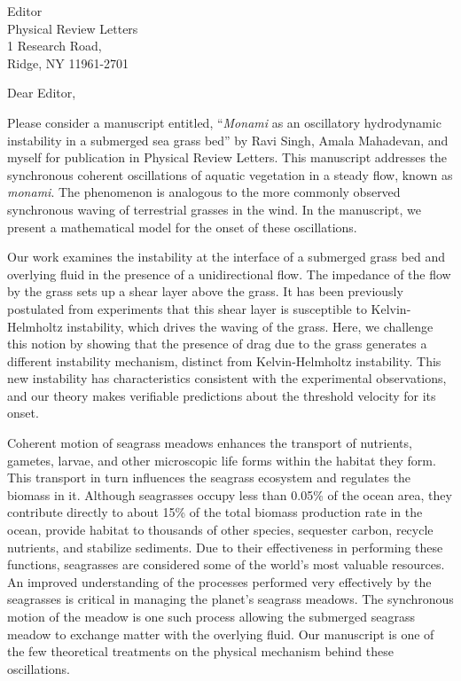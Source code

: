 \documentclass[10pt]{letter}
\date{\today}
\begin{document}
\begin{letter}{
Editor \\
Physical Review Letters \\
1 Research Road, \\
Ridge, NY 11961-2701 
}
\opening{Dear Editor,}

Please consider a manuscript entitled, ``{\it Monami} as an oscillatory hydrodynamic instability in a submerged sea grass bed'' by Ravi Singh, Amala Mahadevan, and myself for publication in  Physical Review Letters. This manuscript addresses the synchronous coherent oscillations of aquatic vegetation in a steady flow, known as {\it monami}. The phenomenon is analogous to the more commonly observed synchronous waving of terrestrial grasses in the wind. In the manuscript, we present a mathematical model for the onset of these oscillations.

Our work examines the instability at the interface of a submerged grass bed and overlying fluid in the presence of a unidirectional flow.  The impedance of the flow by the grass sets up a shear layer above the grass.   It has been previously postulated from experiments that this shear layer is susceptible to  Kelvin-Helmholtz instability, which drives the waving of the grass.  Here, we challenge this notion by showing that the presence of drag due to the grass generates a different instability mechanism, distinct from Kelvin-Helmholtz instability. This new instability has characteristics consistent with the experimental observations, and our theory makes verifiable predictions about the threshold velocity for its onset.

Coherent motion of seagrass meadows enhances the transport of nutrients, gametes, larvae, and other microscopic life forms within the habitat they form. This transport in turn influences the seagrass ecosystem and regulates the biomass in it. Although seagrasses occupy less than 0.05\% of the ocean area, they contribute directly to about 15\% of the total biomass production rate in the ocean, provide habitat to thousands of other species, sequester carbon, recycle nutrients, and stabilize sediments. Due to their effectiveness in performing these functions, seagrasses are considered some of the world's most valuable resources. An improved understanding of the processes performed very effectively by the seagrasses is critical in managing the planet's seagrass meadows. The synchronous motion of the meadow is one such process allowing the submerged seagrass meadow to exchange matter with the overlying fluid. Our manuscript is one of the few theoretical treatments on the physical mechanism behind these oscillations. 


\end{letter}
\end{document}
